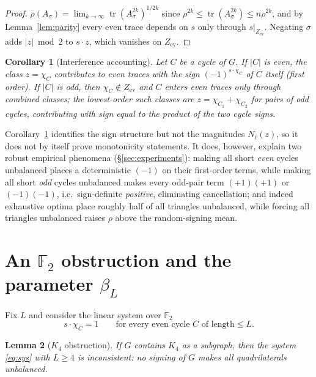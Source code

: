 \documentclass[11pt]{article}
\newtheorem{lemma}{Lemma}
\newtheorem{corollary}[lemma]{Corollary}
\theoremstyle{remark}
\newcommand{\F}{\mathbb{F}}
\newcommand{\Ze}{Z_{\mathrm{ev}}}
\newcommand{\rhomax}{\rho}
\DeclareMathOperator{\tr}{tr}
\begin{document}
\begin{proof}
$\rhomax(A_\sigma)=\lim_{k\to\infty}\tr(A_\sigma^{2k})^{1/2k}$ since
$\rhomax^{2k}\le\tr(A_\sigma^{2k})\le n\rhomax^{2k}$, and by
Lemma~\ref{lem:parity} every even trace depends on $s$ only through
$s|_{\Ze}$. Negating $\sigma$ adds $|z|\bmod 2$ to $s\cdot z$, which
vanishes on $\Ze$.
\end{proof}

\begin{corollary}[Interference accounting]\label{cor:interference}
Let $C$ be a cycle of $G$.
If $|C|$ is even, the class $z=\chi_C$ contributes to even traces with
the sign $(-1)^{s\cdot\chi_C}$ of $C$ itself (first order). If $|C|$ is
odd, then $\chi_C\notin\Ze$ and $C$ enters even traces only through
combined classes; the lowest-order such classes are
$z=\chi_{C_1}+\chi_{C_2}$ for pairs of odd cycles, contributing with sign
equal to the \emph{product} of the two cycle signs.
\end{corollary}

Corollary~\ref{cor:interference} identifies the sign structure but not
the magnitudes $N_\ell(z)$, so it does not by itself prove monotonicity
statements. It does, however, explain two robust empirical phenomena
(\S\ref{sec:experiments}): making all short \emph{even} cycles unbalanced
places a deterministic $(-1)$ on their first-order terms, while making
all short \emph{odd} cycles unbalanced makes every odd-pair term
$(+1)(+1)$ or $(-1)(-1)$, i.e.\ sign-definite \emph{positive},
eliminating cancellation; and indeed exhaustive optima place roughly half
of all triangles unbalanced, while forcing all triangles unbalanced
raises $\rhomax$ above the random-signing mean.

\section{An $\F_2$ obstruction and the parameter $\beta_L$}

Fix $L$ and consider the linear system over $\F_2$
\begin{equation}\label{eq:sys}
s\cdot\chi_C=1\qquad\text{for every even cycle $C$ of length}\le L .
\end{equation}

\begin{lemma}[$K_4$ obstruction]\label{lem:k4}
If $G$ contains $K_4$ as a subgraph, then the system \eqref{eq:sys} with
$L\ge4$ is inconsistent: no signing of $G$ makes all quadrilaterals
unbalanced.
\end{lemma}
\end{document}
